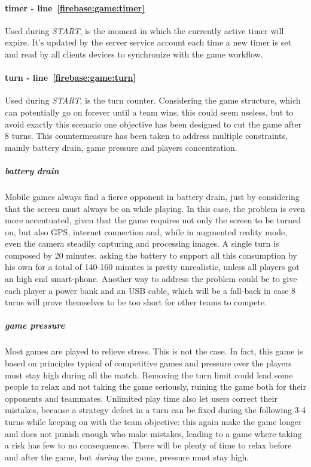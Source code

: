 				\paragraph{timer - line~\ref{firebase:game:timer}}
				Used during \emph{START}, is the moment in which the currently active timer will expire. It's updated by the server service account each time a new timer is set and read by all clients devices to synchronize with the game workflow.
				
				\paragraph{turn - line~\ref{firebase:game:turn}}
				Used during \emph{START}, is the turn counter. Considering the game structure, which can potentially go on forever until a team wins, this could seem useless, but to avoid exactly this scenario one objective has been designed to cut the game after 8 turns.
				This countermeasure has been taken to address multiple constraints, mainly battery drain, game pressure and players concentration.
				
				\subparagraph{battery drain}
				Mobile games always find a fierce opponent in battery drain, just by considering that the screen must always be on while playing.
				In this case, the problem is even more accentuated, given that the game requires not only the screen to be turned on, but also GPS, internet connection and, while in augmented reality mode, even the camera steadily capturing and processing images.
				A single turn is composed by 20 minutes, asking the battery to support all this consumption by his own for a total of 140-160 minutes is pretty unrealistic, unless all players got an high end smart-phone.
				Another way to address the problem could be to give each player a power bank and an USB cable, which will be a fall-back in case 8 turns will prove themselves to be too short for other teams to compete.
				
				\subparagraph{game pressure}
				Most games are played to relieve stress. This is not the case. In fact, this game is based on principles typical of competitive games and pressure over the players must stay high during all the match. Removing the turn limit could lead some people to relax and not taking the game seriously, ruining the game both for their opponents and teammates.
				Unlimited play time also let users correct their mistakes, because a strategy defect in a turn can be fixed during the following 3-4 turns while keeping on with the team objective: this again make the game longer and does not punish enough who make mistakes, leading to a game where taking a risk has few to no consequences.
				There will be plenty of time to relax before and after the game, but \emph{during} the game, pressure must stay high.
				
